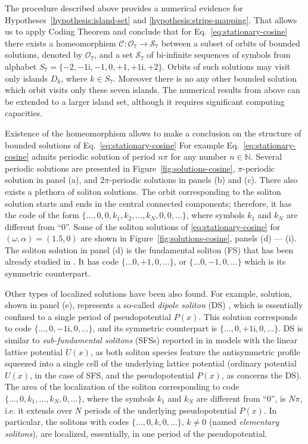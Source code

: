 The procedure described above provides a numerical evidence for Hypotheses~\ref{hypothesis:island-set} and \ref{hypothesis:strips-mapping}.
That allows us to apply Coding Theorem and conclude that for Eq.~\eqref{eq:stationary-cosine} there exists a homeomorphism $\mathcal{C}: \mathcal{O}_7 \to \mathcal{S}_7$ between a subset of orbits of bounded solutions, denoted by $\mathcal{O}_7$, and a set $\mathcal{S}_7$ of bi-infinite sequences of symbols from alphabet $S_7 = \{ -2, -1\mathrm{i}, -1, 0, +1, +1\mathrm{i}, +2 \}$.
Orbits of such solutions may visit only islands $D_k$, where $k \in S_7$.
Moreover there is no any other bounded solution which orbit visits only these seven islands.
The numerical results from above can be extended to a larger island set, although it requires significant computing capacities.

Existence of the homeomorphism allows to make a conclusion on the structure of bounded solutions of Eq.~\ref{eq:stationary-cosine} 
For example Eq.~\ref{eq:stationary-cosine} admits periodic solution of period $n \pi$ for any number $n \in \mathbb{N}$.
Several periodic solutions are presented in Figure~\ref{fig:solutions-cosine}, $\pi$-periodic solution in panel (a), and $2 \pi$-periodic solutions in panels (b) and (c).
There also exists a plethora of soliton solutions.
The orbit corresponding to the soliton solution starts and ends in the central connected components; therefore, it has the code of the form $\{ \dots, 0, 0, k_1, k_2, \dots, k_N, 0, 0, \dots \}$, where symbols $k_1$ and $k_N$ are different from ``$0$''.
Some of the soliton solutions of \eqref{eq:stationary-cosine} for $(\omega, \alpha) = (1.5, 0)$ are shown in Figure~\ref{fig:solutions-cosine}, panels (d) --- (i).
The soliton solution in panel (d) is the fundamental soliton (FS) that has been already studied in \cite{SakaguchiMalomed}.
It has code $\{ \dots 0, +1, 0, \dots \}$, or $\{ \dots 0, -1, 0, \dots \}$ which is its symmetric counterpart.

Other types of localized solutions have been also found.
For example, solution, shown in panel (e), represents a so-called {\it dipole soliton} (DS) \cite{LebedevAlfimovMalomed}, which is essentially confined to a single period of pseudopotential $P(x)$.
This solution corresponds to code $\{ \dots, 0, -1\mathrm{i}, 0, \dots \}$, and its symmetric counterpart is $\{ \dots, 0, +1\mathrm{i}, 0, \dots \}$.
DS is similar to {\it sub-fundamental solitons} (SFSs) reported in \cite{MayteevarunyooMalomed, WangYanLiu, MayteevarunyooMalomedBaizakovSalerno, CuevasMalomedKevrekidisFrantzeskakis} in models with the linear lattice potential $U(x)$, as both soliton species feature the antisymmetric profile squeezed into a single cell of the underlying lattice potential (ordinary potential $U(x)$, in the case of SFS, and the pseudopotential $P(x)$, as concerns the DS).
The area of the localization of the soliton corresponding to code $\{ \dots, 0, k_1, \dots, k_N, 0, \dots \}$, where the symbols $k_1$ and $k_N$ are different from ``$0$'', is $N \pi$, i.e. it extends over $N$ periods of the underlying pseudopotential $P(x)$.
In particular, the solitons with codes $\{ \dots, 0, k, 0, \dots \}$, $k \ne 0$ (named {\it elementary solitons}), are localized, essentially, in one period of the pseudopotential. 


